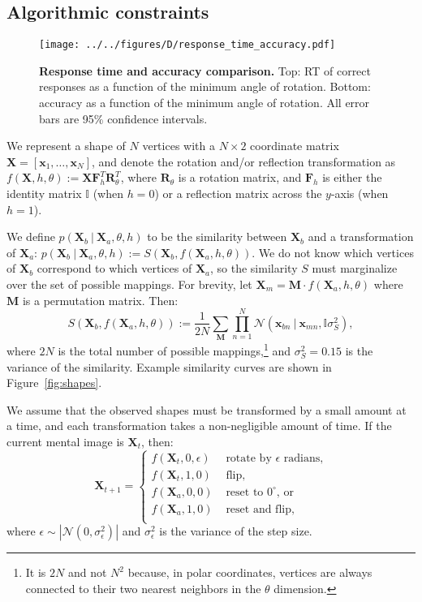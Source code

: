 \documentclass[10pt,letterpaper]{article}
\newcommand{\Xa}[0]{\mathbf{X}_a}
\newcommand{\Xb}[0]{\mathbf{X}_b}
\newcommand{\Xt}[0]{\mathbf{X}_t}
\newcommand{\R}[0]{\mathbf{R}_\theta}
\newcommand{\F}[0]{\mathbf{F}}
\newcommand{\M}[0]{\mathbf{M}}
\newcommand{\I}[0]{\mathbb{I}}
\newcommand{\hi}[0]{h=0}
\newcommand{\hf}[0]{h=1}
\begin{document}
\subsection{Algorithmic constraints}

\begin{figure*}[t]
  \begin{center}
    \texttt{[image: ../../figures/D/response\_time\_accuracy.pdf]}
    \caption{\textbf{Response time and accuracy comparison.} Top: RT
      of correct responses as a function of the minimum angle of
      rotation. Bottom: accuracy as a function of the minimum angle of
      rotation. All error bars are 95\% confidence intervals.}
    \label{fig:response-time-accuracy}
  \end{center}
\end{figure*}

We represent a shape of $N$ vertices with a $N\times 2$ coordinate
matrix $\mathbf{X}=[\mathbf{x}_1, \ldots{}, \mathbf{x}_N]$, and denote
the rotation and/or reflection transformation as $f(\mathbf{X}, h,
\theta):=\mathbf{X}\F_h^T\R^T$, where $\R$ is a rotation matrix, and
$\F_h$ is either the identity matrix $\I$ (when $\hi$) or a reflection
matrix across the $y$-axis (when $\hf$).

We define $p(\Xb\ \vert\ \Xa, \theta, h)$ to be the similarity between
$\Xb$ and a transformation of $\Xa$: $p(\Xb\ \vert\ \Xa, \theta, h):=
S(\Xb, f(\Xa, h, \theta))$.  We do not know which vertices of $\Xb$
correspond to which vertices of $\Xa$, so the similarity $S$ must
marginalize over the set of possible mappings. For brevity, let
$\mathbf{X}_m=\M\cdot{}f(\Xa, h, \theta)$ where $\M$ is a permutation
matrix. Then:
\begin{equation}
  S(\Xb, f(\Xa, h, \theta)):=\frac{1}{2N} \sum_{\M} \prod_{n=1}^N \mathcal{N}(\mathbf{x}_{bn}\ \vert \ \mathbf{x}_{mn}, \I\sigma_S^2),
  \label{eq:similarity}
\end{equation}
where $2N$ is the total number of possible mappings,\footnote{It is
  $2N$ and not $N^2$ because, in polar coordinates, vertices are
  always connected to their two nearest neighbors in the $\theta$
  dimension.} and $\sigma_S^2=0.15$ is the variance of the
similarity. Example similarity curves are shown in
Figure~\ref{fig:shapes}.

We assume that the observed shapes must be transformed by a small
amount at a time, and each transformation takes a non-negligible
amount of time. If the current mental image is $\Xt$, then:
\begin{equation}
  \mathbf{X}_{t+1} = \left\{ \begin{array}{ll}
      f(\Xt, 0, \epsilon) &\mbox{ rotate by $\epsilon$ radians,} \\
      f(\Xt, 1, 0) &\mbox{ flip,} \\
      f(\Xa, 0, 0) &\mbox{ reset to $0^\circ$, or} \\
      f(\Xa, 1, 0) &\mbox{ reset and flip,} \\
    \end{array} \right.
  \label{eq:actions}
\end{equation}
where $\epsilon\sim \left|\mathcal{N}(0, \sigma_\epsilon^2)\right|$
and $\sigma_\epsilon^2$ is the variance of the step size.
\end{document}
